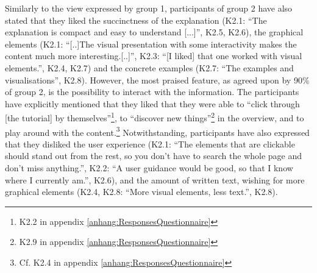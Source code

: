 Similarly to the view expressed by group 1, participants of group 2 have also stated that they liked the succinctness of the explanation (K2.1: \enquote{The explanation is compact and easy to understand [...]}, K2.5, K2.6), the graphical elements (K2.1: \enquote{[..]The visual presentation with some interactivity makes the content much more interesting.[..]}, K2.3: \enquote{[I liked] that one worked with visual elements.}, K2.4, K2.7) and the concrete examples (K2.7: \enquote{The examples and visualisations}, K2.8). However, the most praised feature, as agreed upon by 90\% of group 2, is the possibility to interact with the information. The participants have explicitly mentioned that they liked that they were able to \enquote{click through [the tutorial] by themselves}\footnote{K2.2 in appendix \ref{anhang:ResponsesQuestionnaire}}, to \enquote{discover new things}\footnote{K2.9 in appendix \ref{anhang:ResponsesQuestionnaire}} in the overview, and to play around with the content.\footnote{Cf. K2.4 in appendix \ref{anhang:ResponsesQuestionnaire}} Notwithstanding, participants have also expressed that they disliked the user experience (K2.1: \enquote{The elements that are clickable should stand out from the rest, so you don't have to search the whole page and don't miss anything.}, K2.2: \enquote{A user guidance would be good, so that I know where I currently am.}, K2.6), and the amount of written text, wishing for more graphical elements (K2.4, K2.8: \enquote{More visual elements, less text.}, K2.8).


